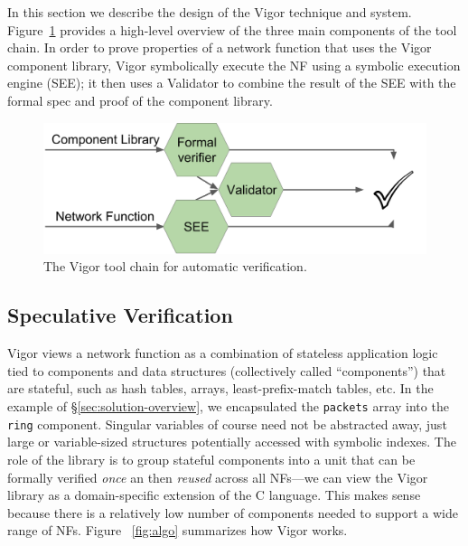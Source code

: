 \documentclass[letterpaper,twocolumn,10pt]{article}
\newcommand{\code}[1]{\lstinline{#1}}
\begin{document}
In this section we describe the design of the Vigor technique and system.
Figure~\ref{fig:arch} provides a high-level overview of the three main
components of the tool chain. In order to prove properties of a network function
that uses the Vigor component library, Vigor symbolically execute the NF using a
symbolic execution engine (SEE); it then uses a Validator to combine the result
of the SEE with the formal spec and proof of the component library.

\begin{figure}[h!]
    \includegraphics[width=\columnwidth]{figures/impl_overview.png}
    \caption{The Vigor tool chain for automatic verification.}
    \label{fig:arch}
\end{figure}

\subsection{Speculative Verification}
\label{sec:our-approach}

Vigor views a network function as a combination of stateless application logic
tied to components and data structures (collectively called ``components'') that
are stateful, such as hash tables, arrays, least-prefix-match tables, etc. In
the example of \S\ref{sec:solution-overview}, we encapsulated the \code{packets}
array into the \code{ring} component. Singular variables of course need not be
abstracted away, just large or variable-sized structures potentially accessed
with symbolic indexes. The role of the library is to group stateful components
into a unit that can be formally verified {\em once} an then {\em reused} across
all NFs---we can view the Vigor library as a domain-specific extension of the C
language. This makes sense because there is a relatively low number of
components needed to support a wide range of NFs. Figure~ \ref{fig:algo}
summarizes how Vigor works.
\end{document}
